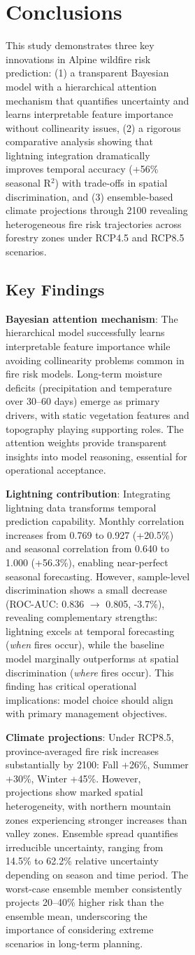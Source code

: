 \documentclass[11pt,a4paper]{article}
\begin{document}
\begin{figure}[H]
\begin{figure}[H]
\begin{figure}[H]
\section{Conclusions}

This study demonstrates three key innovations in Alpine wildfire risk prediction: (1) a transparent Bayesian model with a hierarchical attention mechanism that quantifies uncertainty and learns interpretable feature importance without collinearity issues, (2) a rigorous comparative analysis showing that lightning integration dramatically improves temporal accuracy (+56\% seasonal R$^2$) with trade-offs in spatial discrimination, and (3) ensemble-based climate projections through 2100 revealing heterogeneous fire risk trajectories across forestry zones under RCP4.5 and RCP8.5 scenarios.

\subsection{Key Findings}

\textbf{Bayesian attention mechanism}: The hierarchical model successfully learns interpretable feature importance while avoiding collinearity problems common in fire risk models. Long-term moisture deficits (precipitation and temperature over 30--60 days) emerge as primary drivers, with static vegetation features and topography playing supporting roles. The attention weights provide transparent insights into model reasoning, essential for operational acceptance.

\textbf{Lightning contribution}: Integrating lightning data transforms temporal prediction capability. Monthly correlation increases from 0.769 to 0.927 (+20.5\%) and seasonal correlation from 0.640 to 1.000 (+56.3\%), enabling near-perfect seasonal forecasting. However, sample-level discrimination shows a small decrease (ROC-AUC: 0.836 $\to$ 0.805, -3.7\%), revealing complementary strengths: lightning excels at temporal forecasting (\textit{when} fires occur), while the baseline model marginally outperforms at spatial discrimination (\textit{where} fires occur). This finding has critical operational implications: model choice should align with primary management objectives.

\textbf{Climate projections}: Under RCP8.5, province-averaged fire risk increases substantially by 2100: Fall +26\%, Summer +30\%, Winter +45\%. However, projections show marked spatial heterogeneity, with northern mountain zones experiencing stronger increases than valley zones. Ensemble spread quantifies irreducible uncertainty, ranging from 14.5\% to 62.2\% relative uncertainty depending on season and time period. The worst-case ensemble member consistently projects 20--40\% higher risk than the ensemble mean, underscoring the importance of considering extreme scenarios in long-term planning.


\end{figure}
\end{figure}
\end{figure}
\end{document}
